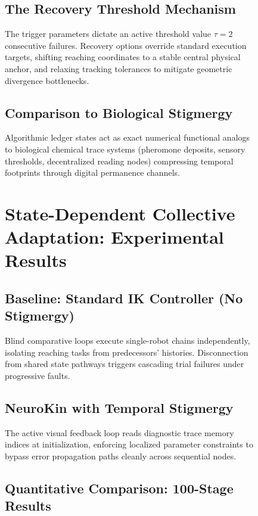 \documentclass[12pt,a4paper,oneside]{report}
\begin{document}
\begin{figure}[H]
\subsection{The Recovery Threshold Mechanism}

The trigger parameters dictate an active threshold value $\tau = 2$ consecutive failures. Recovery options override standard execution targets, shifting reaching coordinates to a stable central physical anchor, and relaxing tracking tolerances to mitigate geometric divergence bottlenecks.

\subsection{Comparison to Biological Stigmergy}

Algorithmic ledger states act as exact numerical functional analogs to biological chemical trace systems (pheromone deposits, sensory thresholds, decentralized reading nodes) compressing temporal footprints through digital permanence channels.

\section{State-Dependent Collective Adaptation: Experimental Results}

\subsection{Baseline: Standard IK Controller (No Stigmergy)}

Blind comparative loops execute single-robot chains independently, isolating reaching tasks from predecessors' histories. Disconnection from shared state pathways triggers cascading trial failures under progressive faults.

\subsection{NeuroKin with Temporal Stigmergy}

The active visual feedback loop reads diagnostic trace memory indices at initialization, enforcing localized parameter constraints to bypass error propagation paths cleanly across sequential nodes.

\subsection{Quantitative Comparison: 100-Stage Results}


\end{figure}
\end{document}
